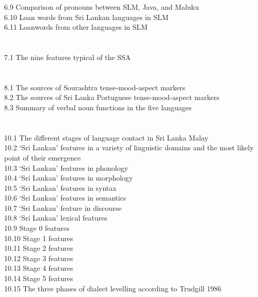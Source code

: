 6.9 Comparison of pronouns between SLM, Java, and Maluku\\
6.10 Loan words from Sri Lankan languages in SLM\\
6.11 Loanwords from other languages in SLM\\
\\\\
7.1 The nine features typical of the SSA\\
\\\\
8.1 The sources of Sourashtra tense-mood-aspect markers\\
8.2 The sources of Sri Lanka Portuguese tense-mood-aspect markers\\
8.3 Summary of verbal noun functions in the five languages\\
\\\\ 
10.1 The different stages of language contact in Sri Lanka Malay\\
10.2 `Sri Lankan' features in a variety of linguistic domains and the most likely point of their emergence\\
10.3 `Sri Lankan' features in phonology\\
10.4 `Sri Lankan' features in morphology\\
10.5 `Sri Lankan' features in syntax\\
10.6 `Sri Lankan' features in semantics\\
10.7 `Sri Lankan' feature in discourse\\
10.8 `Sri Lankan' lexical features\\
10.9 Stage 0 features\\
10.10 Stage 1 features\\
10.11 Stage 2 features\\
10.12 Stage 3 features\\
10.13 Stage 4 features\\
10.14 Stage 5 features\\
10.15 The three phases of dialect levelling according to  Trudgill 1986\\
